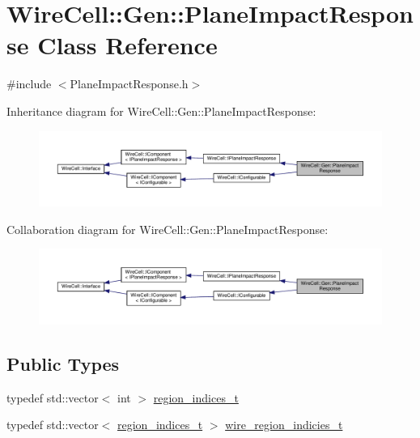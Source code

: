\hypertarget{class_wire_cell_1_1_gen_1_1_plane_impact_response}{}\section{Wire\+Cell\+:\+:Gen\+:\+:Plane\+Impact\+Response Class Reference}
\label{class_wire_cell_1_1_gen_1_1_plane_impact_response}


{\ttfamily \#include $<$Plane\+Impact\+Response.\+h$>$}



Inheritance diagram for Wire\+Cell\+:\+:Gen\+:\+:Plane\+Impact\+Response\+:
\nopagebreak
\begin{figure}[H]
\begin{center}
\leavevmode
\includegraphics[width=350pt]{class_wire_cell_1_1_gen_1_1_plane_impact_response__inherit__graph}
\end{center}
\end{figure}


Collaboration diagram for Wire\+Cell\+:\+:Gen\+:\+:Plane\+Impact\+Response\+:
\nopagebreak
\begin{figure}[H]
\begin{center}
\leavevmode
\includegraphics[width=350pt]{class_wire_cell_1_1_gen_1_1_plane_impact_response__coll__graph}
\end{center}
\end{figure}
\subsection*{Public Types}
\begin{DoxyCompactItemize}
\item 
typedef std\+::vector$<$ int $>$ \hyperlink{class_wire_cell_1_1_gen_1_1_plane_impact_response_a76147eaef10e6fe542bf25d85acc40f7}{region\+\_\+indices\+\_\+t}
\item 
typedef std\+::vector$<$ \hyperlink{class_wire_cell_1_1_gen_1_1_plane_impact_response_a76147eaef10e6fe542bf25d85acc40f7}{region\+\_\+indices\+\_\+t} $>$ \hyperlink{class_wire_cell_1_1_gen_1_1_plane_impact_response_a383b0ed60a99682b46afeb5ecb446078}{wire\+\_\+region\+\_\+indicies\+\_\+t}
\end{DoxyCompactItemize}

